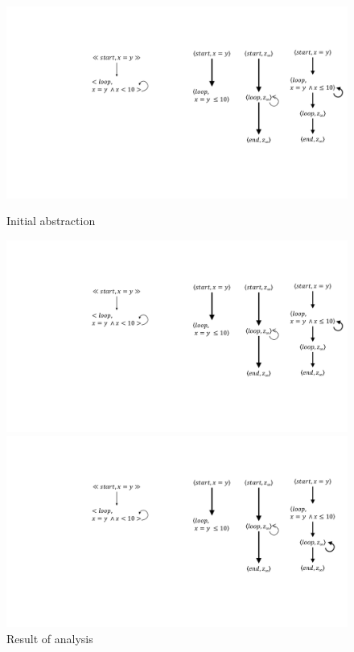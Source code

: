  
 \begin{figure} [h]
 	\centering
 	\begin{minipage} {0.2\linewidth}%
 		\vspace*{10pt}%
 		\includegraphics [width=\textwidth]{include/figures/loop_initial_abst}%
 		\caption{Initial abstraction}
 		\label{fig:x}
 	\end{minipage}%
 	\hspace{20pt}	%
 	\begin{minipage} {0.2\linewidth}%
 		\includegraphics [width=\textwidth] {include/figures/loop_first_ref}%
 		\vspace*{103pt}%
 		\caption{Result of analysis}
 		\label{fig:loopanal}
 	\end{minipage}%
 	\hspace{20pt}%
 	\begin{minipage} {0.25\linewidth}%
 		\includegraphics [width=\textwidth] {include/figures/loop_first_abst}%

\end{minipage}
\end{figure}
